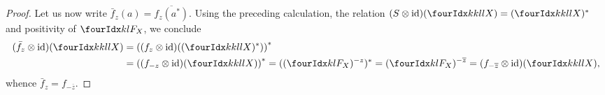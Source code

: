 \begin{proof}
 Let us now write $\bar{f}_z(a) = \overline{f_z(a^*)}$. Using the preceding calculation,
     the relation $(S \otimes \id)(\Gr{X}{k}{l}{k}{l}) =
     (\Gr{X}{k}{l}{k}{l})^{*}$ and positivity of $\Gru{F_{X}}{k}{l}$,
     we conclude
     \begin{align*}
       (\bar{f}_z \otimes
       \id)(\Gr{X}{k}{l}{k}{l})
&=       \left((f_{z} \otimes
       \id)((\Gr{X}{k}{l}{k}{l})^{*})\right)^{*} \\
& = \left((f_{-z} \otimes \id)(\Gr{X}{k}{l}{k}{l})\right)^{*} 
 =
((\Gru{F_{X}}{k}{l})^{-z})^{*} 
=       (\Gru{F_{X}}{k}{l})^{-\overline{z}} = (f_{-\overline{z}}
\otimes \id)(\Gr{X}{k}{l}{k}{l}),
     \end{align*}
whence $\bar{f}_z = f_{-\overline{z}}$.
\end{proof}





  

